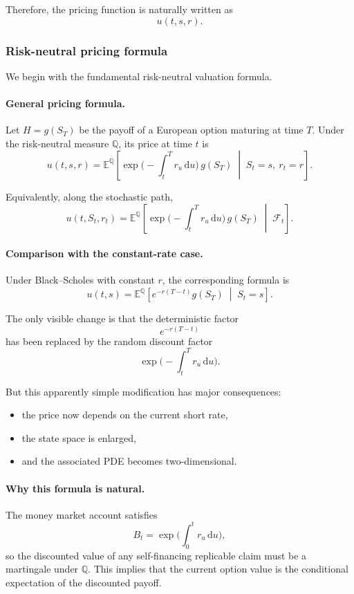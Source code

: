 \documentclass[11pt]{article}
\newcommand{\Qbb}{\mathbb{Q}}
\newcommand{\E}{\mathbb{E}}
\theoremstyle{plain}
\theoremstyle{definition}
\theoremstyle{remark}
\begin{document}
Therefore, the pricing function is naturally written as
\[
u(t,s,r).
\]

\subsubsection{Risk-neutral pricing formula}

We begin with the fundamental risk-neutral valuation formula.

\paragraph{General pricing formula.}
Let \(H=g(S_T)\) be the payoff of a European option maturing at time
\(T\).
Under the risk-neutral measure \(\Qbb\), its price at time \(t\) is
\[
\boxed{
u(t,s,r)
=
\E^\Qbb\!\left[
\exp\!\Big(-\int_t^T r_u\,\mathrm{d}u\Big)\,g(S_T)
\;\middle|\;
S_t=s,\ r_t=r
\right].
}
\]

Equivalently, along the stochastic path,
\[
u(t,S_t,r_t)
=
\E^\Qbb\!\left[
\exp\!\Big(-\int_t^T r_u\,\mathrm{d}u\Big)\,g(S_T)
\;\middle|\;
\mathcal F_t
\right].
\]

\paragraph{Comparison with the constant-rate case.}
Under Black--Scholes with constant \(r\), the corresponding formula is
\[
u(t,s)
=
\E^\Qbb\!\left[
e^{-r(T-t)}g(S_T)
\;\middle|\;
S_t=s
\right].
\]

The only visible change is that the deterministic factor
\[
e^{-r(T-t)}
\]
has been replaced by the random discount factor
\[
\exp\!\Big(-\int_t^T r_u\,\mathrm{d}u\Big).
\]

But this apparently simple modification has major consequences:
\begin{itemize}[leftmargin=1.4em]
    \item the price now depends on the current short rate,
    \item the state space is enlarged,
    \item and the associated PDE becomes two-dimensional.
\end{itemize}

\paragraph{Why this formula is natural.}
The money market account satisfies
\[
B_t=\exp\!\Big(\int_0^t r_u\,\mathrm{d}u\Big),
\]
so the discounted value of any self-financing replicable claim must be a
martingale under \(\Qbb\).
This implies that the current option value is the conditional
expectation of the discounted payoff.
\end{document}
